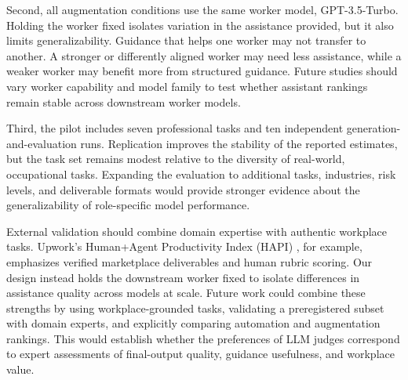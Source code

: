 Second, all augmentation conditions use the same worker model, GPT-3.5-Turbo. Holding the worker fixed isolates variation in the assistance
provided, but it also limits generalizability. Guidance that helps one worker may not transfer to another. A stronger or differently aligned worker may need less assistance, while a weaker worker may benefit more from structured
guidance. Future studies should vary worker capability and model family to test
whether assistant rankings remain stable across downstream worker models.

Third, the pilot includes seven professional tasks and ten independent
generation-and-evaluation runs. Replication improves the stability of the
reported estimates, but the task set remains modest relative to the diversity
of real-world, occupational tasks. Expanding the evaluation to additional tasks, industries, risk levels, and deliverable formats would provide stronger evidence about the generalizability of role-specific model performance.


External validation should combine domain expertise with authentic workplace
tasks. Upwork's Human+Agent Productivity Index (HAPI) \citep{upwork_hapi2025}, for example, emphasizes verified marketplace
deliverables and human rubric scoring. Our design instead holds the downstream
worker fixed to isolate differences in assistance quality across models at
scale. Future work could combine these strengths by using workplace-grounded
tasks, validating a preregistered subset with domain experts, and explicitly
comparing automation and augmentation rankings. This would establish whether
the preferences of LLM judges correspond to expert assessments of final-output quality, guidance usefulness, and workplace value.


